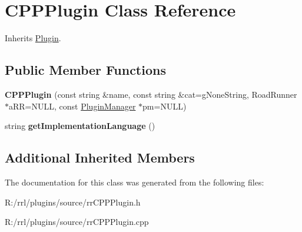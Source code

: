 \hypertarget{classrrp_1_1_c_p_p_plugin}{\section{C\-P\-P\-Plugin Class Reference}
\label{classrrp_1_1_c_p_p_plugin}
}


Inherits \hyperlink{classrrp_1_1_plugin}{Plugin}.

\subsection*{Public Member Functions}
\begin{DoxyCompactItemize}
\item 
\hypertarget{classrrp_1_1_c_p_p_plugin_a9243980dfe277ad3c655b35becd3462c}{{\bfseries C\-P\-P\-Plugin} (const string \&name, const string \&cat=g\-None\-String, Road\-Runner $\ast$a\-R\-R=N\-U\-L\-L, const \hyperlink{classrrp_1_1_plugin_manager}{Plugin\-Manager} $\ast$pm=N\-U\-L\-L)}\label{classrrp_1_1_c_p_p_plugin_a9243980dfe277ad3c655b35becd3462c}

\item 
\hypertarget{classrrp_1_1_c_p_p_plugin_aa20ce1f3b2f2ed0ae69863a5ec562411}{string {\bfseries get\-Implementation\-Language} ()}\label{classrrp_1_1_c_p_p_plugin_aa20ce1f3b2f2ed0ae69863a5ec562411}

\end{DoxyCompactItemize}
\subsection*{Additional Inherited Members}


The documentation for this class was generated from the following files\-:\begin{DoxyCompactItemize}
\item 
R\-:/rrl/plugins/source/rr\-C\-P\-P\-Plugin.\-h\item 
R\-:/rrl/plugins/source/rr\-C\-P\-P\-Plugin.\-cpp\end{DoxyCompactItemize}
